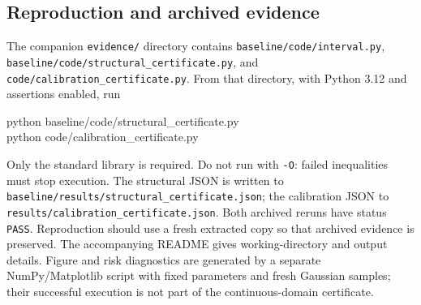 \subsection{Reproduction and archived evidence}
The companion \texttt{evidence/} directory contains \texttt{baseline/code/interval.py}, \texttt{baseline/code/structural\_certificate.py}, and \texttt{code/calibration\_certificate.py}. From that directory, with Python 3.12 and assertions enabled, run
\begin{flushleft}\scriptsize\ttfamily
python baseline/code/structural\_certificate.py\\
python code/calibration\_certificate.py
\end{flushleft}
Only the standard library is required. Do not run with \texttt{-O}: failed inequalities must stop execution. The structural JSON is written to \texttt{baseline/results/structural\_certificate.json}; the calibration JSON to \texttt{results/calibration\_certificate.json}. Both archived reruns have status \texttt{PASS}. Reproduction should use a fresh extracted copy so that archived evidence is preserved. The accompanying README gives working-directory and output details. Figure and risk diagnostics are generated by a separate NumPy/Matplotlib script with fixed parameters and fresh Gaussian samples; their successful execution is not part of the continuous-domain certificate.

